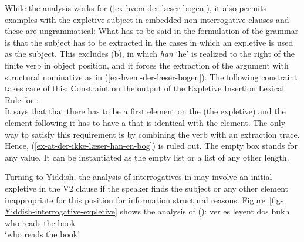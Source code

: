 While the analysis works for (\ref{ex-hvem-der-læser-bogen}), it also permits examples with the
expletive subject in embedded non-interrogative clauses and these are ungrammatical:
\eal
{}
\zl
What has to be said in the formulation of the grammar is that the subject has to be extracted in the
cases in which an expletive is used as the subject. This excludes (b), in which \emph{han}
`he' is realized to the right of the finite verb in object position, and it forces the extraction of
the argument with structural nominative as in (\ref{ex-hvem-der-læser-bogen}). The following
constraint takes care of this:
\ea
Constraint on the output of the Expletive Insertion Lexical Rule for :\\
\z
It says that that there has to be a first element on the \argstl (the expletive) and the element
following it has to have a \slashv that is identical with the element. The only way to satisfy this
requirement is by combining the verb with an extraction trace. Hence,
(\ref{ex-at-der-ikke-læser-han-en-bog}) is ruled out. The empty box stands for any value. It can be
instantiated as the empty list or a list of any other length.

Turning to Yiddish, the analysis of interrogatives in  may involve an initial expletive in the V2
clause if the speaker finds the subject or any other element inappropriate for this position for
information structural reasons. Figure~\ref{fig-Yiddish-interrogative-expletive} shows the analysis of ():
\ea
\gll ver es leyent dos bukh\\
     who \expl{} reads the book\\\yiddish
\glt `who reads the book' 
\z


